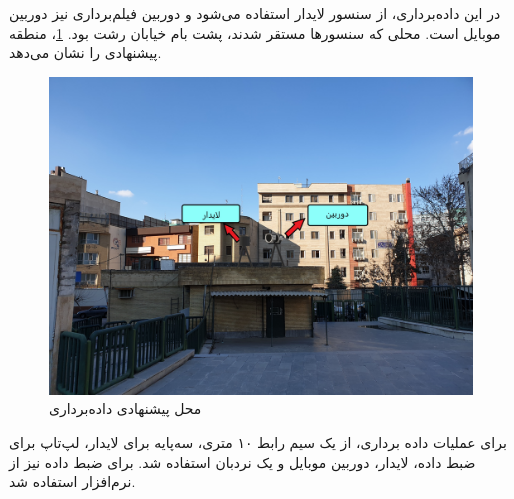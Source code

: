 در این داده‌برداری، از سنسور لایدار  استفاده می‌شود و دوربین فیلم‌برداری نیز دوربین موبایل است. محلی که سنسورها مستقر شدند، پشت بام خیابان رشت بود. \cref{fig:Rasht_Roof_Proposal}، منطقه پیشنهادی را نشان می‌دهد. 

 \begin{figure}[h!]
    \centering
    \includegraphics[width=1\linewidth]{figures/rasht_edited.jpg}
    \caption{محل پیشنهادی داده‌برداری}
    \label{fig:Rasht_Roof_Proposal}
\end{figure}

برای عملیات داده برداری، از یک سیم رابط ۱۰ متری، سه‌پایه برای لایدار، لپ‌تاپ برای ضبط داده، لایدار، دوربین موبایل و یک نردبان استفاده شد. برای ضبط داده نیز از نرم‌افزار  استفاده شد.
\\

